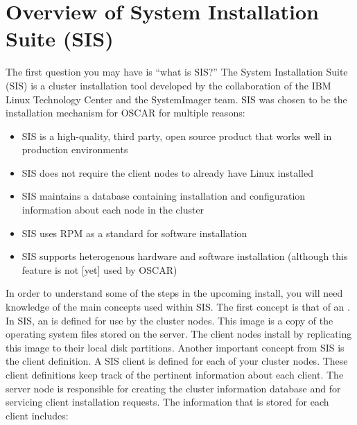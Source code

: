 %
% 
%
%
%

\section{Overview of System Installation Suite (SIS)}
\label{sec:sis}

The first question you may have is ``what is SIS?'' The System
Installation Suite (SIS) is a cluster installation tool developed by
the collaboration of the IBM Linux Technology Center and the
SystemImager team.  SIS was chosen to be the installation mechanism
for OSCAR for multiple reasons:

\begin{itemize}
\item SIS is a high-quality, third party, open source product that
  works well in production environments

\item SIS does not require the client nodes to already have Linux
  installed
  
\item SIS maintains a database containing installation and
  configuration information about each node in the cluster

\item SIS uses RPM as a standard for software installation
  
\item SIS supports heterogenous hardware and software installation
  (although this feature is not [yet] used by OSCAR)
\end{itemize}

In order to understand some of the steps in the upcoming install, you
will need knowledge of the main concepts used within SIS. The first
concept is that of an . In SIS, an  is defined
for use by the cluster nodes. This image is a copy of the operating
system files stored on the server. The client nodes install by
replicating this image to their local disk partitions. Another
important concept from SIS is the client definition.  A SIS client is
defined for each of your cluster nodes.  These client definitions keep
track of the pertinent information about each client.  The server node
is responsible for creating the cluster information database and for
servicing client installation requests.  The information that is
stored for each client includes:

